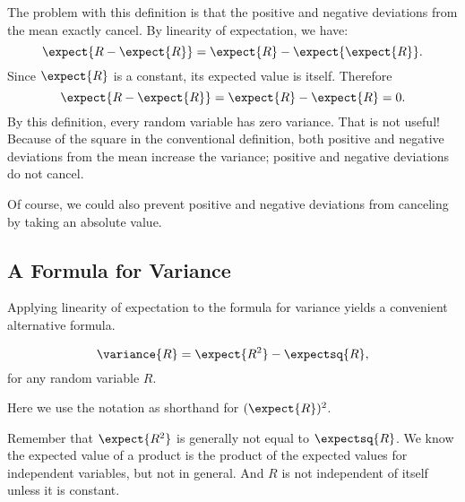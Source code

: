 \begin{editingnotes}
The problem with this definition is that the positive and negative
deviations from the mean exactly cancel.  By linearity of expectation,
we have:
\[
  \expect{R - \expect{R}} = \expect{R} - \expect{\expect{R}}.
\]
Since $\expect{R}$ is a constant, its expected value is itself. Therefore
\[
\expect{R - \expect{R}} = \expect{R} - \expect{R} = 0.
\]
By this definition, every random variable has zero variance.  That is not
useful!  Because of the square in the conventional definition, both
positive and negative deviations from the mean increase the variance;
positive and negative deviations do not cancel.

Of course, we could also prevent positive and negative deviations from
canceling by taking an absolute value.
\end{editingnotes}

\iffalse
It might seem more straightforward to measure the actual average
deviation directly:
\begin{definition}\label{def:expabsdev}
The \term{expected absolute deviation} of a real-valued random
variable $R$ is defined to be
\[
\expect{\, \abs{R - \expect{R}}\, }.
\]
\end{definition}

Taking the root mean square has the effect of weighing larger
deviations more heavily than smaller ones.  A consequence is that
Standard deviation is always at least as large as expected absolute
deviation (see Problem~\ref{PS_variance_vs_absolute_deviation}).  \fi

\iffalse
For example, for independent random variables, the variance of a sum
is the sum of the variances; that is, $\variance{R_1 + R_2} =
\variance{R_1} + \variance{R_2}$.  We will prove this fact below.
\fi


\subsection{A Formula for Variance}
Applying linearity of expectation to the formula for variance yields a convenient
alternative formula.
\begin{lemma}\label{alt:var}
\[
\variance{R} = \expect{R^2} - \expectsq{R},
\]
for any random variable $R$.
\end{lemma}
Here we use the notation  as shorthand for
$(\expect{R})^2$.

\begin{editingnotes}
Remember that $\expect{R^2}$ is generally not equal to $\expectsq{R}$.  We
know the expected value of a product is the product of the expected values
for independent variables, but not in general.  And $R$ is not independent
of itself unless it is constant.
\end{editingnotes}

